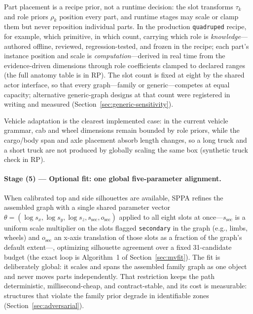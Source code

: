 \documentclass[11pt,a4paper]{article}
\begin{document}
Part placement is a recipe prior, not a runtime decision: the slot
transforms \(\tau_k\) and role priors \(\rho_k\) position every part, and
runtime stages may scale or clamp them but never reposition individual
parts. In the production \texttt{quadruped} recipe, for example, which
primitive, in which
count, carrying which role is \emph{knowledge}---authored offline, reviewed,
regression-tested, and frozen in the recipe; each part's instance position
and scale is \emph{computation}---derived in real time from the
evidence-driven dimensions through role coefficients clamped to declared
ranges (the full anatomy table is in RP). The slot count is fixed at eight by the shared actor interface, so that
every graph---family or generic---competes at equal capacity; alternative
generic-graph designs at that count were registered in writing and measured
(Section~\ref{sec:generic-sensitivity}).

Vehicle adaptation is the clearest implemented case: in the current
vehicle grammar, cab and wheel dimensions remain bounded by role priors,
while the cargo/body span and axle placement absorb length changes, so a
long truck and a short truck are not produced by globally scaling the same
box (synthetic truck check in RP).

\paragraph{Stage (5) --- Optional fit: one global five-parameter alignment.}
When calibrated top and side silhouettes are available, SPPA refines
the assembled graph with a single shared parameter vector
\(\theta=(\log s_x,\log s_y,\log s_z,s_{\mathrm{sec}},o_{\mathrm{sec}})\)
applied to all eight slots at once---\(s_{\mathrm{sec}}\) is a uniform scale
multiplier on the slots flagged \texttt{secondary} in the graph (e.g.,
limbs, wheels) and \(o_{\mathrm{sec}}\) an x-axis translation of those slots
as a fraction of the graph's default extent---, optimizing silhouette agreement over a
fixed 31-candidate budget (the exact loop is
Algorithm~1 of Section~\ref{sec:mvfit}). The fit is deliberately global: it
scales and spans the assembled family graph as one object and never moves
parts independently. That restriction keeps the path deterministic,
millisecond-cheap, and contract-stable, and its cost is measurable:
structures that violate the family prior degrade in identifiable zones
(Section~\ref{sec:adversarial}).
\end{document}
